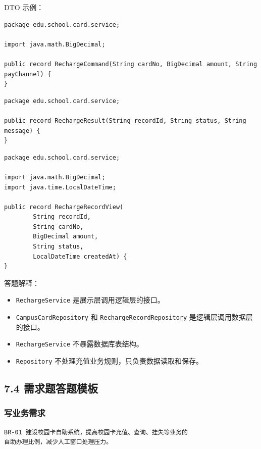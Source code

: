 \documentclass[UTF8,zihao=-4]{ctexart}
\begin{document}
DTO 示例：

\small
\begin{verbatim}
package edu.school.card.service;

import java.math.BigDecimal;

public record RechargeCommand(String cardNo, BigDecimal amount, String payChannel) {
}
\end{verbatim}
\normalsize

\small
\begin{verbatim}
package edu.school.card.service;

public record RechargeResult(String recordId, String status, String message) {
}
\end{verbatim}
\normalsize

\small
\begin{verbatim}
package edu.school.card.service;

import java.math.BigDecimal;
import java.time.LocalDateTime;

public record RechargeRecordView(
        String recordId,
        String cardNo,
        BigDecimal amount,
        String status,
        LocalDateTime createdAt) {
}
\end{verbatim}
\normalsize

答题解释：

\begin{itemize}
\item \texttt{RechargeService} 是展示层调用逻辑层的接口。
\item \texttt{CampusCardRepository} 和 \texttt{RechargeRecordRepository} 是逻辑层调用数据层的接口。
\item \texttt{RechargeService} 不暴露数据库表结构。
\item \texttt{Repository} 不处理充值业务规则，只负责数据读取和保存。
\end{itemize}

\subsection{7.4 需求题答题模板}

\subsubsection{写业务需求}

\small
\begin{verbatim}
BR-01 建设校园卡自助系统，提高校园卡充值、查询、挂失等业务的
自助办理比例，减少人工窗口处理压力。
\end{verbatim}
\normalsize
\end{document}
